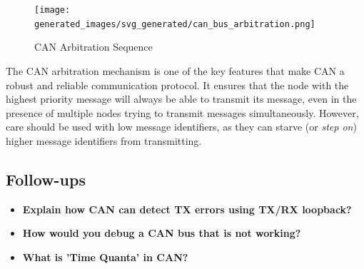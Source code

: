 \documentclass[main.tex]{subfiles}
\begin{document}
\begin{figure}[H]
    \centering
    \texttt{[image: generated\_images/svg\_generated/can\_bus\_arbitration.png]}
    \caption{CAN Arbitration Sequence}
    \label{fig:can-arbitration}
\end{figure}

\noindent The CAN arbitration mechanism is one of the key features that make CAN a robust and reliable communication protocol. It ensures that the node with the highest priority message will always be able to transmit its message, even in the presence of multiple nodes trying to transmit messages simultaneously. However, care should be used with low message identifiers, as they can starve (or \textit{step on}) higher message identifiers from transmitting.

\subsection{Follow-ups}
\begin{itemize}
    \item \textbf{Explain how CAN can detect TX errors using TX/RX loopback?}
    \item \textbf{How would you debug a CAN bus that is not working?}
    \item \textbf{What is 'Time Quanta' in CAN?}
\end{itemize}
\end{document}
